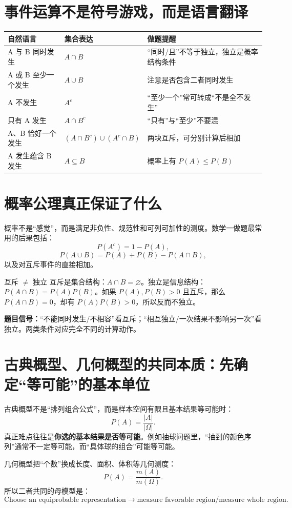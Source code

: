 \documentclass[11pt,a4paper,openany]{ctexbook}
\newcommand{\key}[1]{\textbf{\color{deep}#1}}
\begin{document}
\section{事件运算不是符号游戏，而是语言翻译}
\begin{longtable}{p{3.0cm}p{4.5cm}p{\dimexpr\linewidth-8.35cm\relax}}
\toprule
\textbf{自然语言} & \textbf{集合表达} & \textbf{做题提醒}\\
\midrule
A 与 B 同时发生 & $A\cap B$ & “同时/且”不等于独立，独立是概率结构条件\\
A 或 B 至少一个发生 & $A\cup B$ & 注意是否包含二者同时发生\\
A 不发生 & $A^c$ & “至少一个”常可转成“不是全不发生”\\
只有 A 发生 & $A\cap B^c$ & “只有”与“至少”不要混\\
A、B 恰好一个发生 & $(A\cap B^c)\cup(A^c\cap B)$ & 两块互斥，可分别计算后相加\\
A 发生蕴含 B 发生 & $A\subseteq B$ & 概率上有 $P(A)\le P(B)$\\
\bottomrule
\end{longtable}

\section{概率公理真正保证了什么}
概率不是“感觉”，而是满足非负性、规范性和可列可加性的测度。数学一做题最常用的后果包括：
\[
P(A^c)=1-P(A),
\]
\[
P(A\cup B)=P(A)+P(B)-P(A\cap B),
\]
以及对互斥事件的直接相加。

\begin{boundarybox}{互斥 $\neq$ 独立}
互斥是集合结构：$A\cap B=\varnothing$。独立是信息结构：$P(A\cap B)=P(A)P(B)$。如果 $P(A),P(B)>0$ 且互斥，那么 $P(A\cap B)=0$，却有 $P(A)P(B)>0$，所以反而不独立。

\textbf{题目信号：}“不能同时发生/不相容”看互斥；“相互独立/一次结果不影响另一次”看独立。两类条件对应完全不同的计算动作。
\end{boundarybox}

\section{古典概型、几何概型的共同本质：先确定“等可能”的基本单位}
古典概型不是“排列组合公式”，而是样本空间有限且基本结果等可能时：
\[
P(A)=\frac{|A|}{|\Omega|}.
\]
真正难点往往是\key{你选的基本结果是否等可能}。例如抽球问题里，“抽到的颜色序列”通常不一定等可能，而“具体球的组合”可能等可能。

几何概型把“个数”换成长度、面积、体积等几何测度：
\[
P(A)=\frac{m(A)}{m(\Omega)}.
\]
所以二者共同的母模型是：
\[
\boxed{\text{Choose an equiprobable representation}\to\text{measure favorable region}/\text{measure whole region}.}
\]
\end{document}
